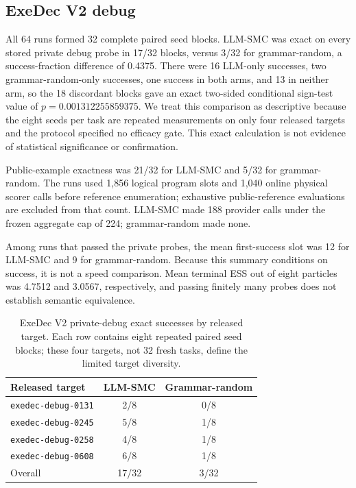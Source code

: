 \documentclass[twoside,11pt]{article}
\begin{document}
\subsection{ExeDec V2 debug}

All 64 runs formed 32 complete paired seed blocks. LLM-SMC was exact on every
stored private debug probe in 17/32 blocks, versus 3/32 for grammar-random, a
success-fraction difference of 0.4375. There were 16 LLM-only successes, two
grammar-random-only successes, one success in both arms, and 13 in neither arm,
so the 18 discordant blocks gave an exact two-sided conditional sign-test value
of $p=0.001312255859375$. We treat this comparison as descriptive because the
eight seeds per task are repeated measurements on only four released targets
and the protocol specified no efficacy gate. This exact calculation is not
evidence of statistical significance or confirmation.

Public-example exactness was 21/32 for LLM-SMC and 5/32 for grammar-random. The
runs used 1,856 logical program slots and 1,040 online physical scorer calls
before reference enumeration; exhaustive public-reference evaluations are
excluded from that count. LLM-SMC
made 188 provider calls under the frozen aggregate cap of 224;
grammar-random made none.

Among runs that passed the private probes, the mean first-success slot was 12
for LLM-SMC and 9 for grammar-random. Because this summary conditions on
success, it is not a speed comparison. Mean terminal ESS out of eight particles
was 4.7512 and 3.0567, respectively, and passing finitely many probes does not
establish semantic equivalence.

\begin{table}[!htbp]
\centering
\caption{ExeDec V2 private-debug exact successes by released target. Each row
contains eight repeated paired seed blocks; these four targets, not 32 fresh
tasks, define the limited target diversity.}
\label{tab:exedec-task-results}
\begin{tabular}{@{}lcc@{}}
\toprule
Released target & LLM-SMC & Grammar-random \\
\midrule
\texttt{exedec-debug-0131} & 2/8 & 0/8 \\
\texttt{exedec-debug-0245} & 5/8 & 1/8 \\
\texttt{exedec-debug-0258} & 4/8 & 1/8 \\
\texttt{exedec-debug-0608} & 6/8 & 1/8 \\
\midrule
Overall & 17/32 & 3/32 \\
\bottomrule
\end{tabular}
\end{table}
\FloatBarrier
\end{document}

